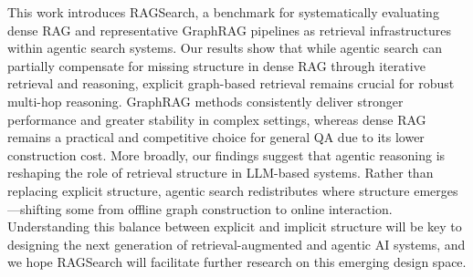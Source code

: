 This work introduces RAGSearch, a benchmark for systematically evaluating dense RAG and representative GraphRAG pipelines as retrieval infrastructures within agentic search systems. Our results show that while agentic search can partially compensate for missing structure in dense RAG through iterative retrieval and reasoning, explicit graph-based retrieval remains crucial for robust multi-hop reasoning. GraphRAG methods consistently deliver stronger performance and greater stability in complex settings, whereas dense RAG remains a practical and competitive choice for general QA due to its lower construction cost.
More broadly, our findings suggest that agentic reasoning is reshaping the role of retrieval structure in LLM-based systems. Rather than replacing explicit structure, agentic search redistributes where structure emerges—shifting some from offline graph construction to online interaction. Understanding this balance between explicit and implicit structure will be key to designing the next generation of retrieval-augmented and agentic AI systems, and we hope RAGSearch will facilitate further research on this emerging design space.
